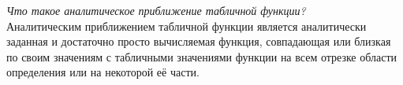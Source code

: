 \documentclass[14pt, a4paper, titlepage, fleqn]{extarticle}
\begin{document}
    \textit{Что такое аналитическое приближение табличной функции?} 
    \\

    Аналитическим приближением
табличной функции является аналитически заданная и достаточно просто
вычисляемая функция, совпадающая или близкая по своим значениям с табличными
значениями функции на всем отрезке области определения или на некоторой её
части.
\end{document}
